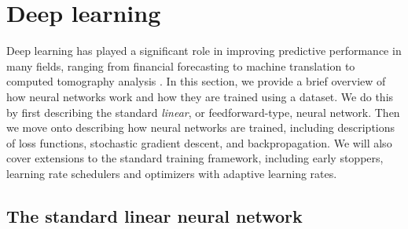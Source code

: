 \documentclass{statsmsc}
\begin{document}
{%

\section{Deep learning}%
\label{sec:Deep learning}


Deep learning has played a significant role in improving predictive performance in many fields,
ranging from financial forecasting \citep{dain,rdain,bin} to machine
translation \citep{gru_cho,attention} to computed tomography analysis
\citep{mixture_ct}. In this section, we provide a brief overview of how neural networks work and
how they are trained using a dataset. We do this by first describing the standard \textit{linear},
or feedforward-type, neural network. Then we move onto describing how neural networks are trained,
including descriptions of loss functions, stochastic gradient descent, and backpropagation. We will
also cover extensions to the standard training framework, including early stoppers, learning
rate schedulers and optimizers with adaptive learning rates.

\subsection{The standard linear neural network}%
\label{sub:The standard linear neural network}

}
\end{document}
